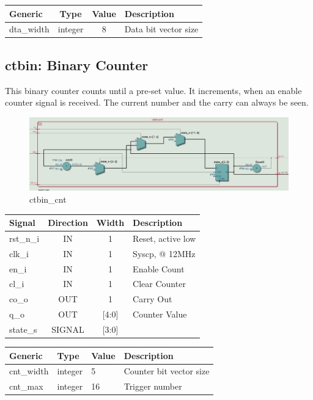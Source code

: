 \documentclass[12pt,a4 paper] {report}
\begin{document}
\begin{center}
	\begin{tabular}{| p{2cm} | c | c | p{5cm} |}
	\hline
	\textbf{Generic} & \textbf{Type} & \textbf{Value} & \textbf{Description} \\
	\hline
	dta\_width & integer & 8 & Data bit vector size \\
	\hline
	\end{tabular}
\end{center}

\newpage

\subsection{ctbin: Binary Counter}
This binary counter counts until a pre-set value. It increments, when an enable counter signal is received. The current 
number and the carry can always be seen.
\begin{figure}[h]
	\centering	
	\includegraphics[scale=0.3]{../png/ctbin_cnt.png}
	\caption{ctbin\_cnt}
\end{figure}
\begin{center}
	\begin{tabular}{ | p{2cm} | c | c | p{5cm} |}
		\hline
		\textbf{Signal} & \textbf{Direction} & \textbf{Width} & \textbf{Description} \\
		\hline
		\hline
 		 rst\_n\_i & IN & 1 & Reset, active low \\
 		 \hline
		clk\_i & IN & 1 & Syscp, @ 12MHz \\
		\hline
		en\_i & IN & 1 & Enable Count \\
		\hline
		cl\_i & IN & 1 & Clear Counter \\
		\hline
		co\_o & OUT & 1 & Carry Out \\
		\hline
		q\_o & OUT & [4:0] & Counter Value \\
		\hline
		\hline
		state\_s & SIGNAL & [3:0] & \\
		\hline
	\end{tabular}
\end{center}
\begin{center}
	\begin{tabular}{| p{2cm} | p{2cm} | p{2cm} | p{5cm} |}
		\hline
		\textbf{Generic} & \textbf{Type} & \textbf{Value} & \textbf{Description} \\
		\hline
 		cnt\_width & integer & 5 & Counter bit vector size \\
		\hline
		cnt\_max & integer & 16 & Trigger number \\
		\hline
	\end{tabular}	
\end{center}
\end{document}
